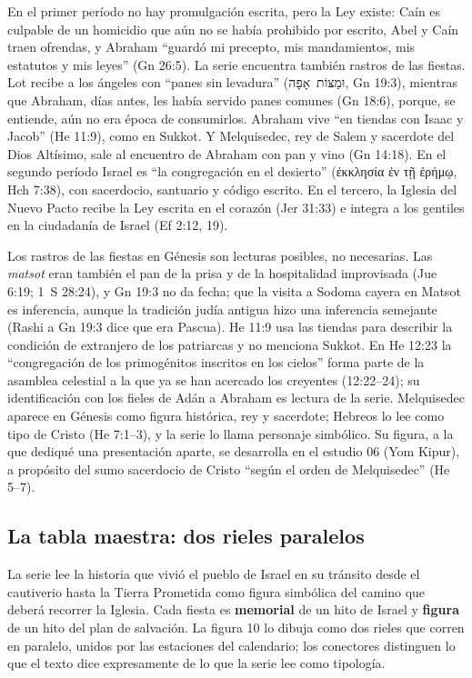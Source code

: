\documentclass[11pt,letterpaper]{article}
\newcommand{\heb}[1]{\mbox{\foreignlanguage{hebrew}{#1}}}
\newcommand{\grc}[1]{\foreignlanguage{ancientgreek}{#1}}
\newcommand{\destacar}[1]{\textbf{\textcolor{tierraroja}{#1}}}
\begin{document}
En el primer período no hay promulgación escrita, pero la Ley existe: Caín es culpable de un homicidio que aún no se había prohibido por escrito, Abel y Caín traen ofrendas, y Abraham ``guardó mi precepto, mis mandamientos, mis estatutos y mis leyes'' (Gn 26:5). La serie encuentra también rastros de las fiestas. Lot recibe a los ángeles con ``panes sin levadura'' (\heb{וּמַצּוֹת אָפָה}, Gn 19:3), mientras que Abraham, días antes, les había servido panes comunes (Gn 18:6), porque, se entiende, aún no era época de consumirlos. Abraham vive ``en tiendas con Isaac y Jacob'' (He 11:9), como en Sukkot. Y Melquisedec, rey de Salem y sacerdote del Dios Altísimo, sale al encuentro de Abraham con pan y vino (Gn 14:18). En el segundo período Israel es ``la congregación en el desierto'' (\grc{ἐκκλησία ἐν τῇ ἐρήμῳ}, Hch 7:38), con sacerdocio, santuario y código escrito. En el tercero, la Iglesia del Nuevo Pacto recibe la Ley escrita en el corazón (Jer 31:33) e integra a los gentiles en la ciudadanía de Israel (Ef 2:12, 19).

\begin{nota}[Precisión]
Los rastros de las fiestas en Génesis son lecturas posibles, no necesarias. Las \emph{matsot} eran también el pan de la prisa y de la hospitalidad improvisada (Jue 6:19; 1~S 28:24), y Gn 19:3 no da fecha; que la visita a Sodoma cayera en Matsot es inferencia, aunque la tradición judía antigua hizo una inferencia semejante (Rashi a Gn 19:3 dice que era Pascua). He 11:9 usa las tiendas para describir la condición de extranjero de los patriarcas y no menciona Sukkot. En He 12:23 la ``congregación de los primogénitos inscritos en los cielos'' forma parte de la asamblea celestial a la que ya se han acercado los creyentes (12:22--24); su identificación con los fieles de Adán a Abraham es lectura de la serie. Melquisedec aparece en Génesis como figura histórica, rey y sacerdote; Hebreos lo lee como tipo de Cristo (He 7:1--3), y la serie lo llama personaje simbólico. Su figura, a la que dediqué una presentación aparte, se desarrolla en el estudio 06 (Yom Kipur), a propósito del sumo sacerdocio de Cristo ``según el orden de Melquisedec'' (He 5--7).
\end{nota}

\subsection{La tabla maestra: dos rieles paralelos}
La serie lee la historia que vivió el pueblo de Israel en su tránsito desde el cautiverio hasta la Tierra Prometida como figura simbólica del camino que deberá recorrer la Iglesia. Cada fiesta es \destacar{memorial} de un hito de Israel y \destacar{figura} de un hito del plan de salvación. La figura 10 lo dibuja como dos rieles que corren en paralelo, unidos por las estaciones del calendario; los conectores distinguen lo que el texto dice expresamente de lo que la serie lee como tipología.
\end{document}
